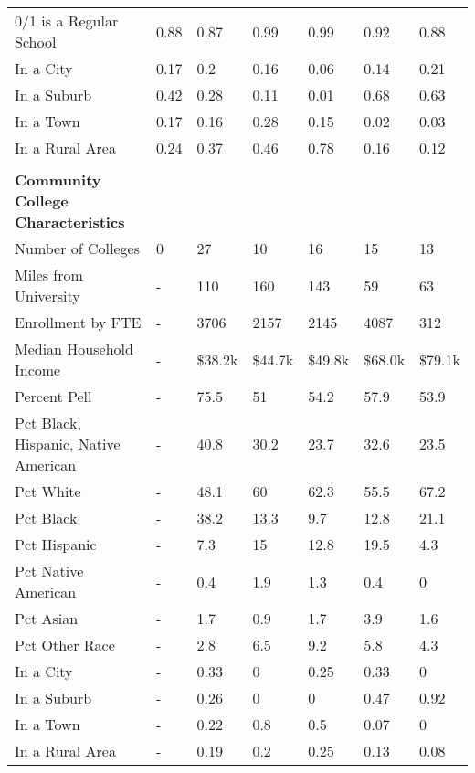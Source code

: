\begin{longtabu}{X[4.5,l] X[1,c] X[1,c] X[1,c] X[1,c] X[1,c] X[1,c]}
\hspace{0.4cm}0/1 is a Regular School&0.88&0.87&0.99&0.99&0.92&0.88\\%
\hspace{0.4cm}In a City&0.17&0.2&0.16&0.06&0.14&0.21\\%
\hspace{0.4cm}In a Suburb&0.42&0.28&0.11&0.01&0.68&0.63\\%
\hspace{0.4cm}In a Town&0.17&0.16&0.28&0.15&0.02&0.03\\%
\hspace{0.4cm}In a Rural Area&0.24&0.37&0.46&0.78&0.16&0.12\\%
&&&&&&\\%
\textbf{Community College Characteristics}&\textbf{}&\textbf{}&\textbf{}&\textbf{}&\textbf{}&\textbf{}\\%
\hspace{0.4cm}Number of Colleges&0&27&10&16&15&13\\%
\hspace{0.4cm}Miles from University&{-}&110&160&143&59&63\\%
\hspace{0.4cm}Enrollment by FTE&{-}&3706&2157&2145&4087&312\\%
\hspace{0.4cm}Median Household Income&{-}&\$38.2k&\$44.7k&\$49.8k&\$68.0k&\$79.1k\\%
\hspace{0.4cm}Percent Pell&{-}&75.5&51&54.2&57.9&53.9\\%
\hspace{0.4cm}Pct Black, Hispanic, Native American&{-}&40.8&30.2&23.7&32.6&23.5\\%
\hspace{0.4cm}Pct White&{-}&48.1&60&62.3&55.5&67.2\\%
\hspace{0.4cm}Pct Black&{-}&38.2&13.3&9.7&12.8&21.1\\%
\hspace{0.4cm}Pct Hispanic&{-}&7.3&15&12.8&19.5&4.3\\%
\hspace{0.4cm}Pct Native American&{-}&0.4&1.9&1.3&0.4&0\\%
\hspace{0.4cm}Pct Asian&{-}&1.7&0.9&1.7&3.9&1.6\\%
\hspace{0.4cm}Pct Other Race&{-}&2.8&6.5&9.2&5.8&4.3\\%
\hspace{0.4cm}In a City&{-}&0.33&0&0.25&0.33&0\\%
\hspace{0.4cm}In a Suburb&{-}&0.26&0&0&0.47&0.92\\%
\hspace{0.4cm}In a Town&{-}&0.22&0.8&0.5&0.07&0\\%
\hspace{0.4cm}In a Rural Area&{-}&0.19&0.2&0.25&0.13&0.08\\%
\end{longtabu}
